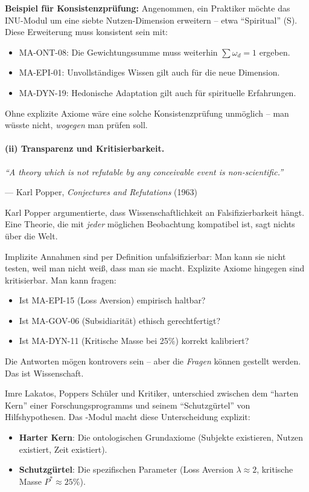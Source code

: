 \textbf{Beispiel für Konsistenzprüfung:} Angenommen, ein Praktiker möchte das INU-Modul um eine siebte Nutzen-Dimension erweitern -- etwa ``Spiritual'' (S). Diese Erweiterung muss konsistent sein mit:
\begin{itemize}
    \item MA-ONT-08: Die Gewichtungssumme muss weiterhin $\sum \omega_d = 1$ ergeben.
    \item MA-EPI-01: Unvollständiges Wissen gilt auch für die neue Dimension.
    \item MA-DYN-19: Hedonische Adaptation gilt auch für spirituelle Erfahrungen.
\end{itemize}

Ohne explizite Axiome wäre eine solche Konsistenzprüfung unmöglich -- man wüsste nicht, \textit{wogegen} man prüfen soll.

\paragraph{(ii) Transparenz und Kritisierbarkeit.}

\epigraph{\textit{``A theory which is not refutable by any conceivable event is non-scientific.''}}{--- Karl Popper, \textit{Conjectures and Refutations} (1963)}

Karl Popper argumentierte, dass Wissenschaftlichkeit an Falsifizierbarkeit hängt. Eine Theorie, die mit \textit{jeder} möglichen Beobachtung kompatibel ist, sagt nichts über die Welt.

Implizite Annahmen sind per Definition unfalsifizierbar: Man kann sie nicht testen, weil man nicht weiß, dass man sie macht. Explizite Axiome hingegen sind kritisierbar. Man kann fragen:
\begin{itemize}
    \item Ist MA-EPI-15 (Loss Aversion) empirisch haltbar?
    \item Ist MA-GOV-06 (Subsidiarität) ethisch gerechtfertigt?
    \item Ist MA-DYN-11 (Kritische Masse bei 25\%) korrekt kalibriert?
\end{itemize}

Die Antworten mögen kontrovers sein -- aber die \textit{Fragen} können gestellt werden. Das ist Wissenschaft.

Imre Lakatos, Poppers Schüler und Kritiker, unterschied zwischen dem ``harten Kern'' einer Forschungsprogramms und seinem ``Schutzgürtel'' von Hilfshypothesen. Das \META-Modul macht diese Unterscheidung explizit:
\begin{itemize}
    \item \textbf{Harter Kern}: Die ontologischen Grundaxiome (Subjekte existieren, Nutzen existiert, Zeit existiert).
    \item \textbf{Schutzgürtel}: Die spezifischen Parameter (Loss Aversion $\lambda \approx 2$, kritische Masse $P^* \approx 25\%$).
\end{itemize}

